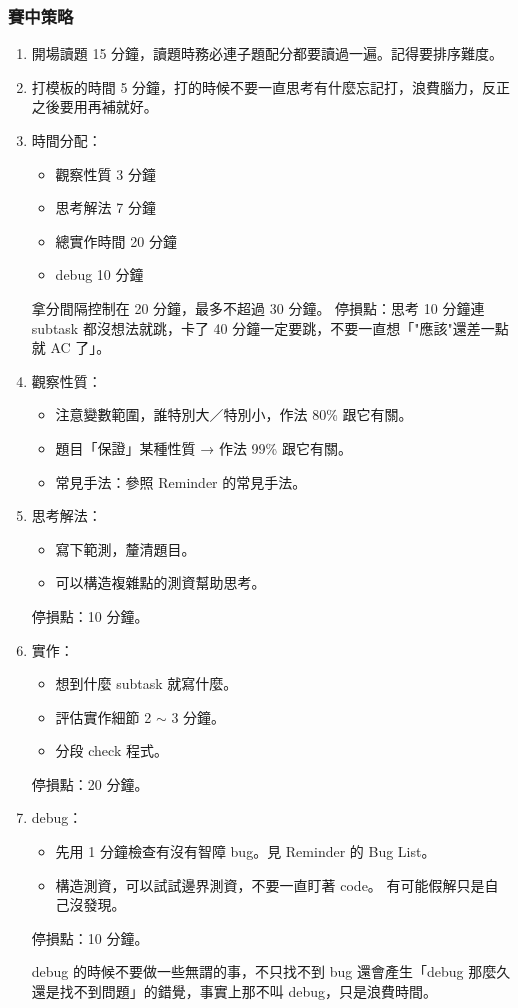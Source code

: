 \documentclass[twocolumn]{article}
\begin{document}
\subsubsection{賽中策略}
\begin{enumerate}
    \item 開場讀題 15 分鐘，讀題時務必連子題配分都要讀過一遍。記得要排序難度。
    
    \item 打模板的時間 5 分鐘，打的時候不要一直思考有什麼忘記打，浪費腦力，反正之後要用再補就好。
    
    \item 時間分配：
    \begin{itemize}
        \item 觀察性質 3 分鐘
        \item 思考解法 7 分鐘
        \item 總實作時間 20 分鐘
        \item debug 10 分鐘
    \end{itemize}
    拿分間隔控制在 20 分鐘，最多不超過 30 分鐘。
    停損點：思考 10 分鐘連 subtask 都沒想法就跳，卡了 40 分鐘一定要跳，不要一直想「"應該"還差一點就 AC 了」。
    
    \item 觀察性質：
    \begin{itemize}
        \item 注意變數範圍，誰特別大／特別小，作法 80\% 跟它有關。
        \item 題目「保證」某種性質 → 作法 99\% 跟它有關。
        \item 常見手法：參照 Reminder 的常見手法。
    \end{itemize}
    
    \item 思考解法：
    \begin{itemize}
        \item 寫下範測，釐清題目。
        \item 可以構造複雜點的測資幫助思考。
    \end{itemize}
    停損點：10 分鐘。
    
    \item 實作：
    \begin{itemize}
        \item 想到什麼 subtask 就寫什麼。
        \item 評估實作細節 2 $\sim$ 3 分鐘。
        \item 分段 check 程式。
    \end{itemize}
    停損點：20 分鐘。
    
    \item debug：
    \begin{itemize}
        \item 先用 1 分鐘檢查有沒有智障 bug。見 Reminder 的 Bug List。
        \item 構造測資，可以試試邊界測資，不要一直盯著 code。
        有可能假解只是自己沒發現。
    \end{itemize}
    停損點：10 分鐘。
    
    debug 的時候不要做一些無謂的事，不只找不到 bug 還會產生「debug 那麼久還是找不到問題」的錯覺，事實上那不叫 debug，只是浪費時間。
\end{enumerate}
\end{document}
